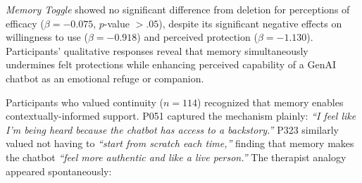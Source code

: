 \documentclass[letterpaper,twocolumn,10pt]{article}
\begin{document}
\begin{table}[htbp]
\centering
\def\arraystretch{1.2}
\caption{CLMM Results: Perceived efficacy of GenAI chatbots for emotional support}
\label{tab:efficacy}
\end{table}

 \emph{Memory Toggle} showed no significant difference from deletion for perceptions of efficacy ($\beta = -0.075$, $p$-value $> .05$), despite its significant negative effects on willingness to use ($\beta = -0.918$) and perceived protection ($\beta = -1.130$). Participants' qualitative responses reveal that memory simultaneously undermines felt protections while enhancing perceived capability of a GenAI chatbot as an emotional refuge or companion.

Participants who valued continuity ($n=114$) recognized that memory enables contextually-informed support. P051 captured the mechanism plainly: \textit{``I feel like I'm being heard because the chatbot has access to a backstory.''} P323 similarly valued not having to \textit{``start from scratch each time,''} finding that memory makes the chatbot \textit{``feel more authentic and like a live person.''} The therapist analogy appeared spontaneously:
\end{document}
